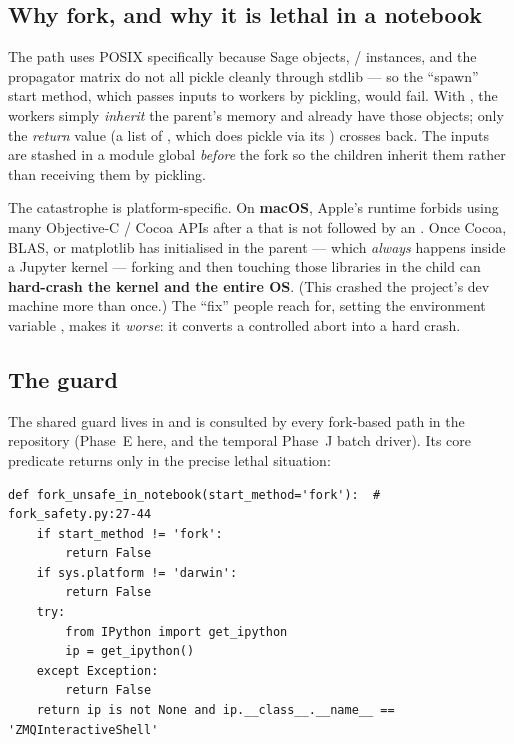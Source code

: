 \subsection{Why fork, and why it is lethal in a notebook}

The path uses POSIX  specifically because Sage  objects,
/ instances, and the propagator matrix do not
all pickle cleanly through stdlib  --- so the ``spawn'' start method,
which passes inputs to workers by pickling, would fail. With , the
workers simply \emph{inherit} the parent's memory and already have those objects;
only the \emph{return} value (a list of , which does pickle via
its ) crosses back. The inputs are stashed in a module
global  \emph{before} the fork so the children inherit
them rather than receiving them by pickling.

The catastrophe is platform-specific. On \textbf{macOS}, Apple's runtime forbids
using many Objective-C / Cocoa APIs after a  that is not followed by
an . Once Cocoa, BLAS, or matplotlib has initialised in the parent
--- which \emph{always} happens inside a Jupyter kernel --- forking and then
touching those libraries in the child can \textbf{hard-crash the kernel and the
entire OS}. (This crashed the project's dev machine more than once.) The
``fix'' people reach for, setting the environment variable
, makes it \emph{worse}: it
converts a controlled abort into a hard crash.

\subsection{The guard}

The shared guard lives in  and is consulted by every
fork-based path in the repository (Phase~E here, and the temporal Phase~J
batch driver). Its core predicate returns  only in the precise lethal
situation:

\begin{lstlisting}
def fork_unsafe_in_notebook(start_method='fork'):  # fork_safety.py:27-44
    if start_method != 'fork':
        return False
    if sys.platform != 'darwin':
        return False
    try:
        from IPython import get_ipython
        ip = get_ipython()
    except Exception:
        return False
    return ip is not None and ip.__class__.__name__ == 'ZMQInteractiveShell'
\end{lstlisting}

